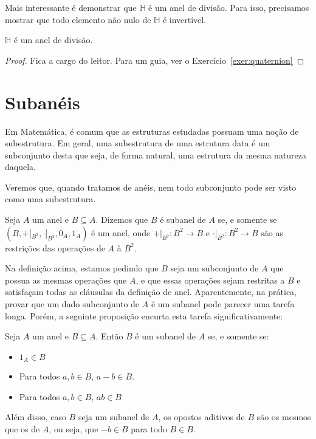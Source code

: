 Mais interessante é demonstrar que $\mathbb H$ é um anel de divisão. Para isso, precisamos mostrar que todo elemento não nulo de $\mathbb H$ é invertível.

\begin{prop}
    $\mathbb H$ é um anel de divisão.
\end{prop}
\begin{proof}
    Fica a cargo do leitor. Para um guia, ver o Exercício~\ref{exer:quaternion}
\end{proof}
\section{Subanéis}
Em Matemática, é comum que as estruturas estudadas possuam uma noção de subestrutura.
Em geral, uma subestrutura de uma estrutura data é um subconjunto desta que seja, de forma natural, uma estrutura da mesma natureza daquela.

Veremos que, quando tratamos de anéis, nem todo subconjunto pode ser visto como uma subestrutura.

\begin{definition}[Subanel]
    Seja $A$ um anel e $B \subseteq A$. Dizemos que $B$ é subanel de $A$ se, e somente se $(B, +|_{B^2}, \cdot|_{B^2}, 0_A, 1_A)$ é um anel, onde $+|_{B^2}:B^2\rightarrow B$ e $\cdot|_{B^2}:B^2\rightarrow B$ são as restrições das operações de $A$ à $B^2$.
\end{definition}

Na definição acima, estamos pedindo que $B$ seja um subconjunto de $A$ que possua as mesmas operações que $A$, e que essas operações sejam restritas a $B$ e satisfaçam todas as cláusulas da definição de anel. Aparentemente, na prática, provar que um dado subconjunto de $A$ é um subanel pode parecer uma tarefa longa. Porém, a seguinte proposição encurta esta tarefa significativamente: 

\begin{prop}[Subanel]
    Seja $A$ um anel e $B\subseteq A$. Então $B$ é um subanel de $A$ se, e somente se:
    \begin{itemize}
        \item $1_A \in B$
        \item Para todos $a, b \in B$, $a-b \in B$.
        \item Para todos $a, b \in B$, $ab\in B$
    \end{itemize}

    Além disso, caso $B$ seja um subanel de $A$, os opostos aditivos de $B$ são os mesmos que os de $A$, ou seja, que $-b \in B$ para todo $B \in B$.
\end{prop}

